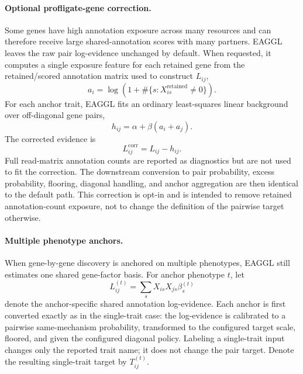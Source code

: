 \documentclass[11pt]{article}
\begin{document}
\paragraph{Optional profligate-gene correction.}
Some genes have high annotation exposure across many resources and can therefore receive
large shared-annotation scores with many partners. EAGGL leaves the raw pair
log-evidence unchanged by default. When requested, it computes a single exposure feature
for each retained gene from the retained/scored annotation matrix used to construct
$L_{ij}$,
\begin{equation}
a_i = \log\left(1 + \#\{s:X_{is}^{\mathrm{retained}}\ne 0\}\right).
\end{equation}
For each anchor trait, EAGGL fits an ordinary least-squares linear background over
off-diagonal gene pairs,
\begin{equation}
h_{ij} = \alpha + \beta(a_i+a_j).
\end{equation}
The corrected evidence is
\begin{equation}
L_{ij}^{\mathrm{corr}} = L_{ij} - h_{ij}.
\end{equation}
Full read-matrix annotation counts are reported as diagnostics but are not used to fit
the correction.
The downstream conversion to pair probability, excess probability, flooring, diagonal
handling, and anchor aggregation are then identical to the default path. This correction
is opt-in and is intended to remove retained annotation-count exposure, not to change the
definition of the pairwise target otherwise.


\paragraph{Multiple phenotype anchors.}
When gene-by-gene discovery is anchored on multiple phenotypes, EAGGL still estimates
one shared gene-factor basis. For anchor phenotype $t$, let
\begin{equation}
L_{ij}^{(t)}
= \sum_s X_{is} X_{js} \beta_s^{(t)}
\label{eq:eaggl_gene_gene_anchor_logbf}
\end{equation}
denote the anchor-specific shared annotation log-evidence. Each anchor is first
converted exactly as in the single-trait case: the log-evidence is calibrated to a
pairwise same-mechanism probability, transformed to the configured target scale, floored,
and given the configured diagonal policy. Labeling a single-trait input changes only the
reported trait name; it does not change the pair target. Denote the resulting
single-trait target by $T_{ij}^{(t)}$.
\end{document}
